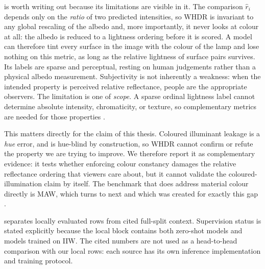  is worth writing out because its limitations are visible in it.
The comparison $\hat{r}_i$ depends only on the \emph{ratio} of two predicted
intensities, so WHDR is invariant to any global rescaling of the albedo and, more
importantly, it never looks at colour at all: the albedo is reduced to a lightness
ordering before it is scored.
A model can therefore tint every surface in the image with the colour of the lamp
and lose nothing on this metric, as long as the relative lightness of surface pairs
survives.
Its labels are sparse and perceptual, resting on human judgements rather than a
physical albedo measurement. Subjectivity is not inherently a weakness: when
the intended property is perceived relative reflectance, people are the
appropriate observers. The limitation is one of \emph{scope}. A sparse ordinal
lightness label cannot determine absolute intensity, chromaticity, or texture,
so complementary metrics are needed for those properties
.

This matters directly for the claim of this thesis. Coloured illuminant leakage is
a \emph{hue} error, and  is hue-blind by construction, so WHDR
cannot confirm or refute the property we are trying to improve. We therefore report
it as complementary evidence: it tests whether enforcing colour constancy damages
the relative reflectance ordering that viewers care about, but it cannot validate
the coloured-illumination claim by itself.
The benchmark that does address material colour directly is MAW, which
 turns to next and which was created for exactly this gap
.

 separates locally evaluated rows from cited full-split context.
Supervision status is stated explicitly because the local block contains both zero-shot
models and models trained on IIW. The cited numbers are not used as a head-to-head
comparison with our local rows: each source has its own inference implementation and
training protocol.

